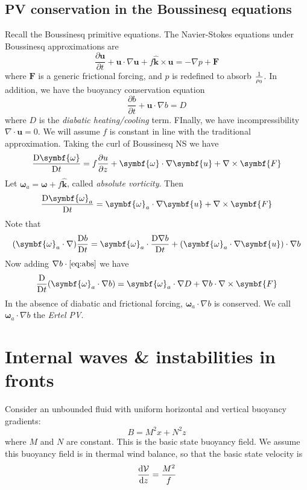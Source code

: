 \documentclass{jknotes}
\begin{document}
\subsection{PV conservation in the Boussinesq equations}
Recall the Boussinesq primitive equations. The Navier-Stokes equations under
Boussinesq approximations are
\begin{equation}
	\frac{\partial \symbf{u}}{\partial t} + \symbf{u}\cdot \nabla \symbf{u} +
	f \hat{\symbf{k}} \times \symbf{u} = -\nabla p + \symbf{F}
\end{equation}
where $\symbf{F}$ is a generic frictional forcing, and $p$ is redefined to
absorb $\frac{1}{\rho_0}$. In addition, we have the buoyancy conservation equation
\begin{equation}
	\frac{\partial b}{\partial t} + \symbf{u} \cdot \nabla b = D
\end{equation}
where $D$ is the \emph{diabatic heating/cooling} term. FInally, we have
incompressibility $\nabla \cdot \symbf{u} = 0$. We will assume $f$ is constant
in line with the traditional approximation. Taking the curl of Boussinesq NS
we have
\begin{equation}
	\frac{\diffD \symbf{\omega}}{\diffD t} = f\frac{\partial u}{\partial z} +
	\symbf{\omega} \cdot \nabla \symbf{u} + \nabla \times \symbf{F}
\end{equation}
Let $\symbf{\omega}_a = \symbf{\omega} + f\hat{\symbf{k}}$, called
\emph{absolute vorticity}. Then
\begin{equation}
	\frac{\diffD \symbf{\omega}_a}{\diffD t} = \symbf{\omega}_a \cdot \nabla
	\symbf{u} + \nabla \times \symbf{F} \label{eq:abs}
\end{equation}
Note that
\begin{equation}
	(\symbf{\omega}_a\cdot\nabla)\frac{\diffD b}{\diffD t} = \symbf{\omega}_a
	\cdot \frac{\diffD \nabla b}{\diffD t} + (\symbf{\omega}_a \cdot \nabla
	\symbf{u})\cdot\nabla b
\end{equation}
Now adding $\nabla b \cdot \eqref{eq:abs}$ we have
\begin{equation}
	\frac{\diffD}{\diffD t} (\symbf{\omega}_a \cdot \nabla b) =
	\symbf{\omega}_a \cdot \nabla D + \nabla b \cdot \nabla \times \symbf{F}
\end{equation}
In the absence of diabatic and frictional forcing, $\symbf{\omega}_a \cdot
\nabla b$ is conserved. We call $\symbf{\omega}_a \cdot \nabla b$ the
\emph{Ertel PV}.

\section{Internal waves \& instabilities in fronts}
Consider an unbounded fluid with uniform horizontal and vertical buoyancy
gradients:
\begin{equation}
	B = M^2 x + N^2 z
\end{equation}
where $M$ and $N$ are constant. This is the basic state buoyancy field. We
assume this buoyancy field is in thermal wind balance, so that the basic state
velocity is
\begin{equation}
	\frac{\diffd \mathcal{V}}{\diffd z} = \frac{M^2}{f}
\end{equation}
\end{document}
